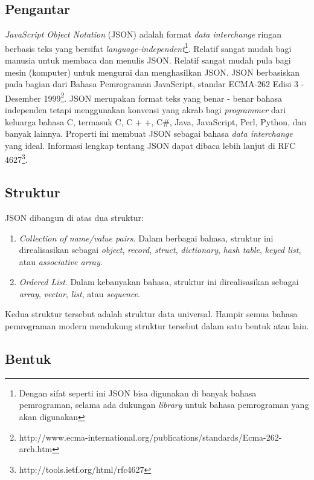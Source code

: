 \documentclass[a4paper, 12pt]{report}
\begin{document}
\subsection{Pengantar}
\onehalfspacing \textit{JavaScript Object Notation} (JSON) adalah format \textit{data interchange} ringan berbasis teks yang bersifat \textit{language-independent}\footnote{Dengan sifat seperti ini JSON bisa digunakan di banyak bahasa pemrograman, selama ada dukungan \textit{library} untuk bahasa pemrograman yang akan digunakan}. Relatif sangat mudah bagi manusia untuk membaca dan menulis JSON. Relatif sangat mudah pula bagi mesin (komputer) untuk mengurai dan menghasilkan JSON. JSON berbasiskan pada bagian dari Bahasa Pemrograman JavaScript, standar ECMA-262 Edisi 3 - Desember 1999\footnote{http://www.ecma-international.org/publications/standards/Ecma-262-arch.htm}. JSON merupakan format teks yang benar - benar bahasa independen tetapi menggunakan konvensi yang akrab bagi \textit{programmer} dari keluarga bahasa C, termasuk C, C + +, C\#, Java, JavaScript, Perl, Python, dan banyak lainnya. Properti ini membuat JSON sebagai bahasa \textit{data interchange} yang ideal\cite{introducing-json}. Informasi lengkap tentang JSON dapat dibaca lebih lanjut di RFC 4627\footnote{http://tools.ietf.org/html/rfc4627}.

\subsection{Struktur}
\onehalfspacing JSON dibangun di atas dua struktur\cite{introducing-json}:
\begin{enumerate}
  \item \textit{Collection of name/value pairs}. Dalam berbagai bahasa, struktur ini direalisasikan sebagai \textit{object}, \textit{record}, \textit{struct}, \textit{dictionary}, \textit{hash table}, \textit{keyed list}, atau \textit{associative array}.
  \item \textit{Ordered List}. Dalam kebanyakan bahasa, struktur ini direalisasikan sebagai \textit{array}, \textit{vector}, \textit{list}, atau \textit{sequence}.
\end{enumerate}

\onehalfspacing Kedua struktur tersebut adalah struktur data universal. Hampir semua bahasa pemrograman modern mendukung struktur tersebut dalam satu bentuk atau lain.

\subsection{Bentuk}
\onehalfspacing 
\end{document}

